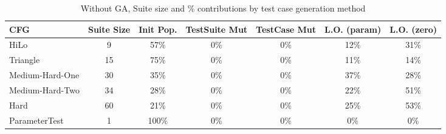 \documentclass[runningheads]{llncs}
\begin{document}
\begin{table}[h!]
	\begin{center}
		\begin{tabular}{| l | c || c | c | c | c | c |}
			\hline
			CFG             & Suite Size & Init Pop. & TestSuite Mut & TestCase Mut & L.O. (param) & L.O. (zero) \\ \hline
			HiLo            & 9          & 57\%      & 0\%           & 0\%          & 12\%         & 31\%        \\ \hline
			Triangle        & 15         & 75\%      & 0\%           & 0\%          & 11\%         & 14\%        \\ \hline
			Medium-Hard-One & 30         & 35\%      & 0\%           & 0\%          & 37\%         & 28\%        \\ \hline
			Medium-Hard-Two & 34         & 28\%      & 0\%           & 0\%          & 22\%         & 51\%        \\ \hline
			Hard            & 60         & 21\%      & 0\%           & 0\%          & 25\%         & 53\%        \\ \hline
			ParameterTest   & 1          & 100\%     & 0\%           & 0\%          & 0\%          & 0\%         \\ \hline
		\end{tabular}
	\end{center}
	\caption{Without GA, Suite size and \% contributions by test case generation method} 
	\label{tab:ContribNoGA}
\end{table}
\end{document}
